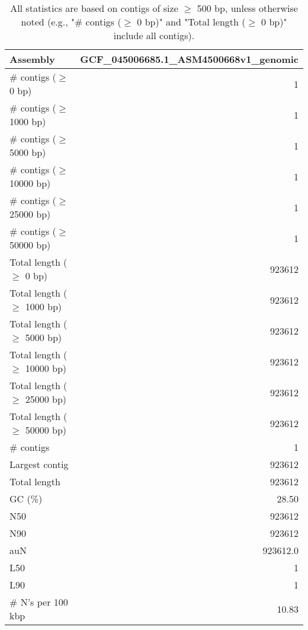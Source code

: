 \documentclass[12pt,a4paper]{article}
\begin{document}
\begin{table}[ht]
\begin{center}
\caption{All statistics are based on contigs of size $\geq$ 500 bp, unless otherwise noted (e.g., "\# contigs ($\geq$ 0 bp)" and "Total length ($\geq$ 0 bp)" include all contigs).}
\begin{tabular}{|l*{1}{|r}|}
\hline
Assembly & GCF\_045006685.1\_ASM4500668v1\_genomic \\ \hline
\# contigs ($\geq$ 0 bp) & 1 \\ \hline
\# contigs ($\geq$ 1000 bp) & 1 \\ \hline
\# contigs ($\geq$ 5000 bp) & 1 \\ \hline
\# contigs ($\geq$ 10000 bp) & 1 \\ \hline
\# contigs ($\geq$ 25000 bp) & 1 \\ \hline
\# contigs ($\geq$ 50000 bp) & 1 \\ \hline
Total length ($\geq$ 0 bp) & 923612 \\ \hline
Total length ($\geq$ 1000 bp) & 923612 \\ \hline
Total length ($\geq$ 5000 bp) & 923612 \\ \hline
Total length ($\geq$ 10000 bp) & 923612 \\ \hline
Total length ($\geq$ 25000 bp) & 923612 \\ \hline
Total length ($\geq$ 50000 bp) & 923612 \\ \hline
\# contigs & 1 \\ \hline
Largest contig & 923612 \\ \hline
Total length & 923612 \\ \hline
GC (\%) & 28.50 \\ \hline
N50 & 923612 \\ \hline
N90 & 923612 \\ \hline
auN & 923612.0 \\ \hline
L50 & 1 \\ \hline
L90 & 1 \\ \hline
\# N's per 100 kbp & 10.83 \\ \hline
\end{tabular}
\end{center}
\end{table}
\end{document}
